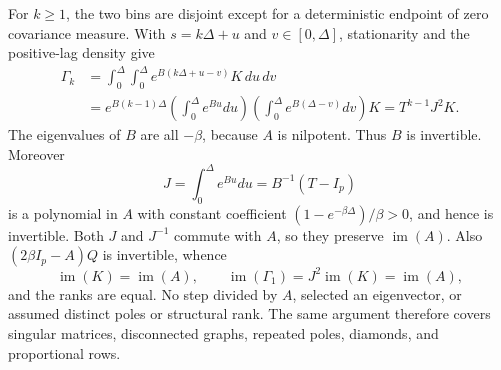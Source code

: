 For \(k\geq1\), the two bins are disjoint except for a deterministic endpoint of zero covariance measure.  With \(s=k\Delta+u\) and \(v\in[0,\Delta]\), stationarity and the positive-lag density give
\[
\begin{aligned}
 \Gamma_k
 &=\int_0^\Delta\int_0^\Delta e^{B(k\Delta+u-v)}K\,du\,dv\\
 &=e^{B(k-1)\Delta}\left(\int_0^\Delta e^{Bu}du\right)
   \left(\int_0^\Delta e^{B(\Delta-v)}dv\right)K
 =T^{k-1}J^2K.
\end{aligned}
\]
The eigenvalues of \(B\) are all \(-\beta\), because \(A\) is nilpotent.  Thus \(B\) is invertible.  Moreover
\[
 J=\int_0^\Delta e^{Bu}du=B^{-1}(T-I_p)
\]
is a polynomial in \(A\) with constant coefficient \((1-e^{-\beta\Delta})/\beta>0\), and hence is invertible.  Both \(J\) and \(J^{-1}\) commute with \(A\), so they preserve \(\operatorname{im}(A)\).  Also \((2\beta I_p-A)Q\) is invertible, whence
\[
 \operatorname{im}(K)=\operatorname{im}(A),\qquad
 \operatorname{im}(\Gamma_1)=J^2\operatorname{im}(K)=\operatorname{im}(A),
\]
and the ranks are equal.  No step divided by \(A\), selected an eigenvector, or assumed distinct poles or structural rank.  The same argument therefore covers singular matrices, disconnected graphs, repeated poles, diamonds, and proportional rows.